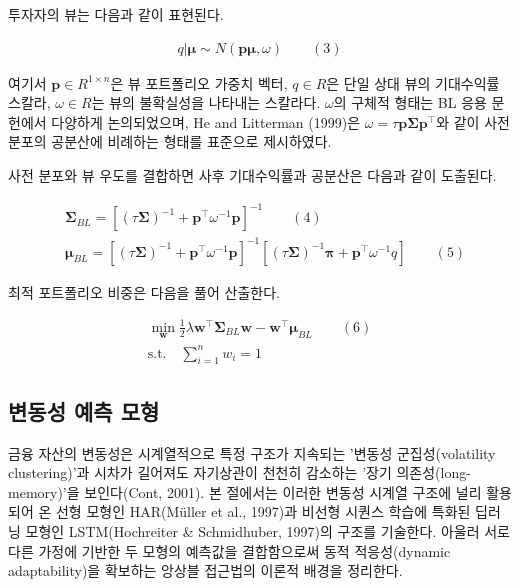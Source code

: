 \documentclass{article}
\begin{document}
투자자의 뷰는 다음과 같이 표현된다.

\begin{align}
    q|\boldsymbol{\mu} \sim N(\mathbf{p}\boldsymbol{\mu}, \omega) \qquad(3)\end{align}

여기서 $\mathbf{p} \in R^{1 \times n}$은 뷰 포트폴리오 가중치 벡터, $q \in R$은 단일 상대 뷰의 기대수익률 스칼라, $\omega\in R$는 뷰의 불확실성을 나타내는 스칼라다. $\omega$의 구체적 형태는 BL 응용 문헌에서 다양하게 논의되었으며, He and Litterman (1999)은 $\omega = \tau\mathbf{p}\boldsymbol{\Sigma}\mathbf{p}^\top$와 같이 사전 분포의 공분산에 비례하는 형태를 표준으로 제시하였다.

사전 분포와 뷰 우도를 결합하면 사후 기대수익률과 공분산은 다음과 같이 도출된다.

\begin{align}
    & \boldsymbol{\Sigma}_{BL} = [(\tau\boldsymbol{\Sigma})^{-1} + \mathbf{p}^\top\omega^{-1}\mathbf{p}]^{-1} \qquad(4)\\
    
    & \boldsymbol{\mu}_{BL} = [(\tau\boldsymbol{\Sigma})^{-1} + \mathbf{p}^\top\omega^{-1}\mathbf{p}]^{-1}[(\tau\boldsymbol{\Sigma})^{-1}\boldsymbol{\pi}+\mathbf{p}^\top\omega^{-1}q] \qquad(5)\end{align}

최적 포트폴리오 비중은 다음을 풀어 산출한다.

\begin{align}
    \min_{\mathbf{w}}\frac{1}{2}\lambda\mathbf{w}^\top\boldsymbol{\Sigma}_{BL}\mathbf{w}-\mathbf{w}^\top\boldsymbol{\mu}_{BL} \qquad(6)\\
\text{s.t.} \quad \sum_{i=1}^{n}{w_i} = 1
\end{align}

\subsection{변동성 예측 모형}
\label{subsec:vol_pred_review}

금융 자산의 변동성은 시계열적으로 특정 구조가 지속되는 '변동성 군집성(volatility clustering)'과 시차가 길어져도 자기상관이 천천히 감소하는 '장기 의존성(long-memory)'을 보인다(Cont, 2001). 본 절에서는 이러한 변동성 시계열 구조에 널리 활용되어 온 선형 모형인 HAR(Müller et al., 1997)과 비선형 시퀀스 학습에 특화된 딥러닝 모형인 LSTM(Hochreiter & Schmidhuber, 1997)의 구조를 기술한다. 아울러 서로 다른 가정에 기반한 두 모형의 예측값을 결합함으로써 동적 적응성(dynamic adaptability)을 확보하는 앙상블 접근법의 이론적 배경을 정리한다.
\end{document}
